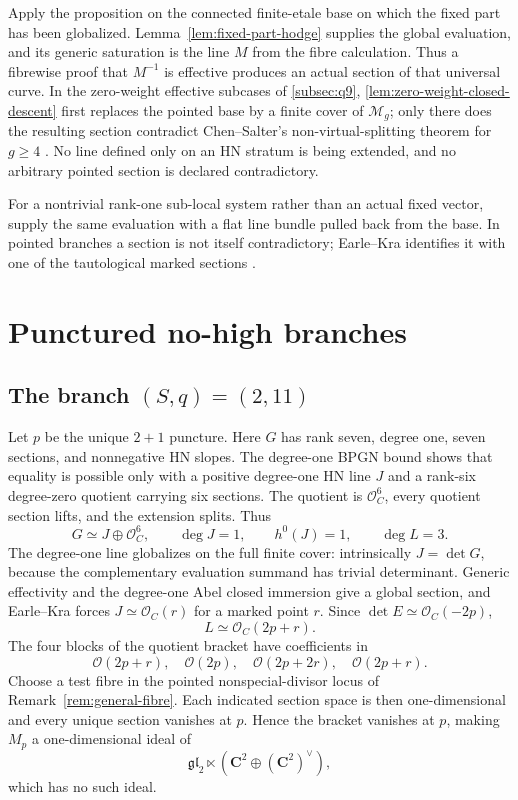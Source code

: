 \documentclass[11pt]{article}
\theoremstyle{definition}
\newcommand{\C}{\mathbf C}
\newcommand{\Ocal}{\mathcal O}
\newcommand{\Mcal}{\mathcal M}
\begin{document}
Apply the proposition on the connected finite-etale base on which the fixed
part has been globalized.  Lemma~\ref{lem:fixed-part-hodge} supplies the global
evaluation, and its generic saturation is the line $M$ from the fibre
calculation.  Thus a fibrewise proof that $M^{-1}$ is effective produces an
actual section of that universal curve.  In the zero-weight effective
subcases of \cref{subsec:q9},
\cref{lem:zero-weight-closed-descent} first replaces the pointed base by a
finite cover of $\Mcal_g$; only there does the resulting section contradict
Chen--Salter's non-virtual-splitting theorem for $g\ge4$
\cite{ChenSalter}.  No line defined only on an HN stratum is being extended,
and no arbitrary pointed section is declared contradictory.

For a nontrivial rank-one sub-local system rather than an actual fixed vector,
\cite[Proposition 4.2.2 and Lemma 6.1.1]{LLCan} supply the same evaluation
with a flat line bundle pulled back from the base.  In pointed branches a
section is not itself contradictory; Earle--Kra identifies it with one of
the tautological marked sections \cite{EarleKra}.

\section{Punctured no-high branches}\label{sec:punctured-no-high}

\subsection{The branch \texorpdfstring{$(S,q)=(2,11)$}{(S,q)=(2,11)}}

Let $p$ be the unique $2+1$ puncture.  Here $G$ has rank seven,
degree one, seven sections, and nonnegative HN slopes.  The degree-one BPGN
bound shows that equality is possible only with a positive degree-one HN line
$J$ and a rank-six degree-zero quotient carrying six sections.  The quotient
is $\Ocal_C^6$, every quotient section lifts, and the extension splits.  Thus
\[
 G\simeq J\oplus\Ocal_C^6,
 \qquad
 \deg J=1,
 \qquad h^0(J)=1,
 \qquad \deg L=3.
\]
The degree-one line globalizes on the full finite cover: intrinsically
$J=\det G$, because the complementary evaluation summand has trivial
determinant.  Generic effectivity and the degree-one Abel closed immersion
give a global section, and Earle--Kra forces
$J\simeq\Ocal_C(r)$ for a marked point $r$.  Since
$\det E\simeq\Ocal_C(-2p)$,
\[
 L\simeq\Ocal_C(2p+r).
\]
The four blocks of the quotient bracket have coefficients in
\[
 \Ocal(2p+r),\quad \Ocal(2p),\quad
 \Ocal(2p+2r),\quad \Ocal(2p+r).
\]
Choose a test fibre in the pointed nonspecial-divisor locus of
Remark~\ref{rem:general-fibre}.  Each indicated section space is then
one-dimensional and every unique section vanishes at $p$.  Hence the bracket
vanishes at $p$, making $M_p$ a one-dimensional ideal of
\[
 \mathfrak{gl}_2\ltimes(\C^2\oplus(\C^2)^\vee),
\]
which has no such ideal.
\end{document}
